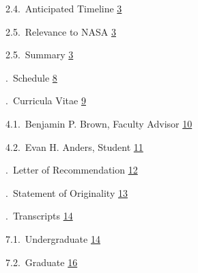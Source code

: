 \documentclass[12pt]{article}
\begin{document}
\vspace*{0.06in}
\noindent\hspace*{0.25in}
2.4.$\,$ Anticipated Timeline
\dotfill \hyperlink{page.3}{3}

\vspace*{0.06in}
\noindent\hspace*{0.25in}
2.5.$\,$ Relevance to NASA
\dotfill \hyperlink{page.3}{3}

\vspace*{0.06in}
\noindent\hspace*{0.25in}
2.5.$\,$ Summary
\dotfill \hyperlink{page.3}{3}

\vspace*{0.06in}
.$\,$ Schedule
\dotfill \hyperlink{page.8}{8}

\vspace*{0.06in}
.$\,$ Curricula Vitae
\dotfill \hyperlink{page.9}{9}

\vspace*{0.06in}
\noindent\hspace*{0.25in}
4.1.$\,$ Benjamin P. Brown, Faculty Advisor
\dotfill \hyperlink{page.10}{10}

\vspace*{0.06in}
\noindent\hspace*{0.25in}
4.2.$\,$ Evan H. Anders, Student
\dotfill \hyperlink{page.11}{11}

\vspace*{0.06in}
.$\,$ Letter of Recommendation
\dotfill \hyperlink{page.12}{12}

\vspace*{0.06in}
.$\,$ Statement of Originality
\dotfill \hyperlink{page.13}{13}

\vspace*{0.06in}
.$\,$ Transcripts
\dotfill \hyperlink{page.14}{14}

\vspace*{0.06in}
\noindent\hspace*{0.25in}
7.1.$\,$ Undergraduate
\dotfill \hyperlink{page.14}{14}

\vspace*{0.06in}
\noindent\hspace*{0.25in}
7.2.$\,$ Graduate
\dotfill \hyperlink{page.16}{16}

\newpage
{}


\newpage
{}

\end{document}
